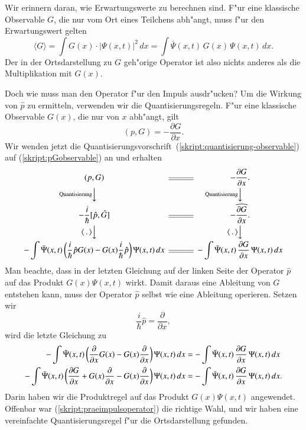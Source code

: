 Wir erinnern daran, wie Erwartungswerte zu berechnen sind.
F"ur eine klassische  Observable $G$, die nur vom Ort eines Teilchens abh"angt,
muss f"ur den Erwartungswert gelten
\[
\langle G\rangle = \int G(x)\cdot |\Psi(x,t)|^2\,dx
=
\int\bar\Psi(x,t)\,G(x)\,\Psi(x,t)\,dx.
\]
Der in der Ortsdarstellung zu $G$ geh"orige Operator ist also nichts
anderes als die Multiplikation mit $G(x)$.

Doch wie muss man den Operator f"ur den Impuls ausdr"ucken?
Um die Wirkung von $\hat p$ zu ermitteln, verwenden wir die
Quantisierungsregeln.
F"ur eine klassische Observable $G(x)$, die nur von $x$
abh"angt, gilt
\begin{equation}
(p,G)=-\frac{\partial G}{\partial x}.
\label{skript:pGobservable}
\end{equation}
Wir wenden jetzt die
Quantisierungsvorschrift~(\ref{skript:quantisierung-observable})
auf (\ref{skript:pGobservable}) an und erhalten
\[
\begin{CD}
\displaystyle(p,G)     @=   \displaystyle-\frac{\partial G}{\partial x}.\\
@V\text{Quantisierung}VV           @V\text{Quantisierung}VV   \\
\displaystyle-\frac{i}{\hbar}[\hat p,\hat G]
@=
\displaystyle-\widehat{\frac{\partial G}{\partial x}}.\\
@V\textstyle\langle\,.\,\rangle VV           @V\textstyle\langle\,.\,\rangle VV   \\
\displaystyle -\int \bar\Psi(x,t)\,\biggl(\frac{i}{\hbar}\hat p G(x)-G(x)\frac{i}{\hbar}\hat p\biggr)\,\Psi(x,t)\,dx
@=
\displaystyle -\int \bar \Psi(x,t)\,\frac{\partial G}{\partial x}\,\Psi(x,t)\,dx
\end{CD}
\]
Man beachte, dass in der letzten Gleichung auf der linken Seite der Operator
$\hat p$ auf das Produkt $G(x)\Psi(x,t)$ wirkt.
Damit daraus eine Ableitung von $G$ entstehen kann, muss der Operator
$\hat p$ selbst wie eine Ableitung operieren. Setzen wir
\begin{equation}
\frac{i}{\hbar}\hat p = \frac{\partial}{\partial x},
\label{skript:praeimpulsoperator}
\end{equation}
wird die letzte Gleichung zu
\begin{align}
-\int \bar\Psi(x,t)\,\biggl(\frac{\partial}{\partial x}G(x)-G(x)\frac{\partial}{\partial x}\biggr)\,\Psi(x,t)\,dx
&=
-\int \bar \Psi(x,t)\,\frac{\partial G}{\partial x}\,\Psi(x,t)\,dx
\notag
\\
-\int \bar\Psi(x,t)\,\biggl(
\frac{\partial G}{\partial x}
+
G(x)\frac{\partial}{\partial x}
-G(x)\frac{\partial}{\partial x}\biggr)\,\Psi(x,t)\,dx
&=
-\int \bar \Psi(x,t)\,\frac{\partial G}{\partial x}\,\Psi(x,t)\,dx.
\label{skript:produktregelpG}
\end{align}
Darin haben wir die Produktregel auf das Produkt $G(x)\Psi(x,t)$ angewendet.
Offenbar war (\ref{skript:praeimpulsoperator}) die richtige Wahl, und wir
haben eine vereinfachte Quantisierungsregel f"ur die Ortsdarstellung
gefunden.

